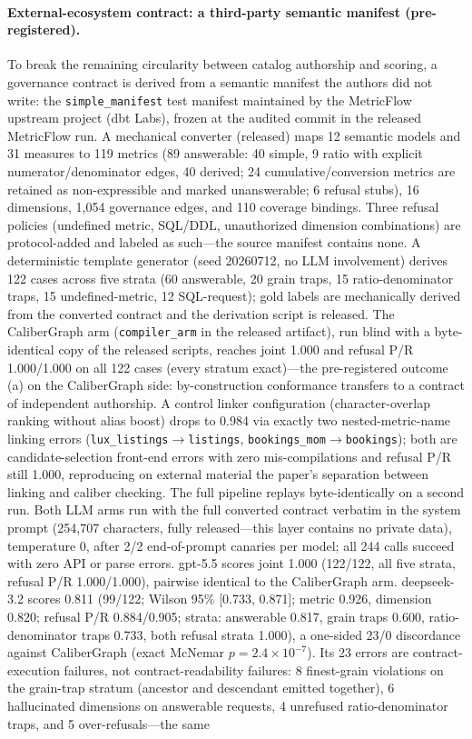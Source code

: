 \documentclass[letterpaper]{article}
\begin{document}
\paragraph{External-ecosystem contract: a third-party semantic manifest (pre-registered).}
To break the remaining circularity between catalog authorship and scoring, a governance contract is derived from a semantic manifest the authors did not write: the \texttt{simple\_manifest} test manifest maintained by the MetricFlow upstream project (dbt Labs), frozen at the audited commit in the released MetricFlow run. A mechanical converter (released) maps 12 semantic models and 31 measures to 119 metrics (89 answerable: 40 simple, 9 ratio with explicit numerator/denominator edges, 40 derived; 24 cumulative/conversion metrics are retained as non-expressible and marked unanswerable; 6 refusal stubs), 16 dimensions, 1{,}054 governance edges, and 110 coverage bindings. Three refusal policies (undefined metric, SQL/DDL, unauthorized dimension combinations) are protocol-added and labeled as such---the source manifest contains none. A deterministic template generator (seed 20260712, no LLM involvement) derives 122 cases across five strata (60 answerable, 20 grain traps, 15 ratio-denominator traps, 15 undefined-metric, 12 SQL-request); gold labels are mechanically derived from the converted contract and the derivation script is released. The CaliberGraph arm (\texttt{compiler\_arm} in the released artifact), run blind with a byte-identical copy of the released scripts, reaches joint 1.000 and refusal P/R 1.000/1.000 on all 122 cases (every stratum exact)---the pre-registered outcome (a) on the CaliberGraph side: by-construction conformance transfers to a contract of independent authorship. A control linker configuration (character-overlap ranking without alias boost) drops to 0.984 via exactly two nested-metric-name linking errors (\texttt{lux\_listings}$\to$\allowbreak\texttt{listings}, \texttt{bookings\_mom}$\to$\allowbreak\texttt{bookings}); both are candidate-selection front-end errors with zero mis-compilations and refusal P/R still 1.000, reproducing on external material the paper's separation between linking and caliber checking. The full pipeline replays byte-identically on a second run. Both LLM arms run with the full converted contract verbatim in the system prompt (254{,}707 characters, fully released---this layer contains no private data), temperature 0, after 2/2 end-of-prompt canaries per model; all 244 calls succeed with zero API or parse errors. gpt-5.5 scores joint 1.000 (122/122, all five strata, refusal P/R 1.000/1.000), pairwise identical to the CaliberGraph arm. deepseek-3.2 scores 0.811 (99/122; Wilson 95\% [0.733, 0.871]; metric 0.926, dimension 0.820; refusal P/R 0.884/0.905; strata: answerable 0.817, grain traps 0.600, ratio-denominator traps 0.733, both refusal strata 1.000), a one-sided 23/0 discordance against CaliberGraph (exact McNemar $p{=}2.4{\times}10^{-7}$). Its 23 errors are contract-execution failures, not contract-readability failures: 8 finest-grain violations on the grain-trap stratum (ancestor and descendant emitted together), 6 hallucinated dimensions on answerable requests, 4 unrefused ratio-denominator traps, and 5 over-refusals---the same 
\end{document}
